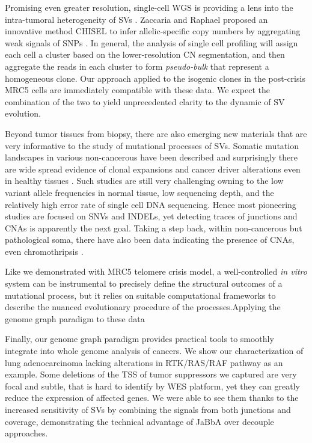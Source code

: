 \documentclass[phd,tocprelim]{cornell}
\begin{document}
Promising even greater resolution, single-cell WGS is providing a lens into the intra-tumoral heterogeneity of SVs \cite{Zaccaria2020-bn,laks2019,Salehi2021-xi}. Zaccaria and Raphael proposed an innovative method CHISEL to infer allelic-specific copy numbers by aggregating weak signals of SNPs . In general, the analysis of single cell profiling will assign each cell a cluster based on the lower-resolution CN segmentation, and then aggregate the reads in each cluster to form \textit{pseudo-bulk} that represent a homogeneous clone. Our approach applied to the isogenic clones in the post-crisis MRC5 cells are immediately compatible with these data. We expect the combination of the two to yield unprecedented clarity to the dynamic of SV evolution.

Beyond tumor tissues from biopsy, there are also emerging new materials that are very informative to the study of mutational processes of SVs. Somatic mutation landscapes in various non-cancerous have been described and surprisingly there are wide spread evidence of clonal expansions and cancer driver alterations even in healthy tissues \cite{Martincorena:2018fk}. Such studies are still very challenging owning to the low variant allele frequencies in normal tissue, low sequencing depth, and the relatively high error rate of single cell DNA sequencing. Hence most pioneering studies are focused on SNVs and INDELs, yet detecting traces of junctions and CNAs is apparently the next goal. Taking a step back, within non-cancerous but pathological soma, there have also been data indicating the presence of CNAs, even chromothripsis \cite{McDermott2015-xc}.

Like we demonstrated with MRC5 telomere crisis model, a well-controlled \textit{in vitro} system can be instrumental to precisely define the structural outcomes of a mutational process, but it relies on suitable computational frameworks to describe the nuanced evolutionary procedure of the processes.Applying the genome graph paradigm to these data 

Finally, our genome graph paradigm provides practical tools to smoothly integrate into whole genome analysis of cancers. We show our characterization of lung adenocarcinoma lacking alterations in RTK/RAS/RAF pathway as an example. Some deletions of the TSS of tumor suppressors we captured are very focal and subtle, that is hard to identify by WES platform, yet they can greatly reduce the expression of affected genes. We were able to see them thanks to the increased sensitivity of SVs by combining the signals from both junctions and coverage, demonstrating the technical advantage of JaBbA over decouple approaches.
\end{document}
